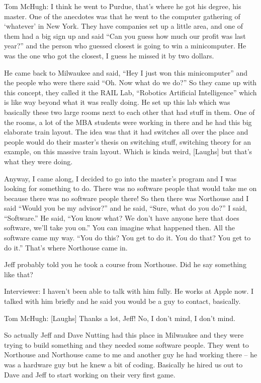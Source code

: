 \textcolor{interviewee}{Tom McHugh:} I think he went to Purdue, that’s where he got his degree, his master. One of the anecdotes was that he went to the computer gathering of ‘whatever’ in New York. They have companies set up a little area, and one of them had a big sign up and said “Can you guess how much our profit was last year?” and the person who guessed closest is going to win a minicomputer. He was the one who got the closest, I guess he missed it by two dollars.

He came back to Milwaukee and said, “Hey I just won this minicomputer” and the people who were there said “Oh. Now what do we do?” So they came up with this concept, they called it the RAIL Lab, “Robotics Artificial Intelligence” which is like way beyond what it was really doing. He set up this lab which was basically these two large rooms next to each other that had stuff in them. One of the rooms, a lot of the MBA students were working in there and he had this big elaborate train layout. The idea was that it had switches all over the place and people would do their master’s thesis on switching stuff, switching theory for an example, on this massive train layout. Which is kinda weird, [Laughs] but that’s what they were doing.

Anyway, I came along, I decided to go into the master’s program and I was looking for something to do. There was no software people that would take me on because there was no software people there! So then there was Northouse and I said “Would you be my advisor?” and he said, “Sure, what do you do?” I said, “Software.” He said, “You know what? We don’t have anyone here that does software, we’ll take you on.” You can imagine what happened then. All the software came my way. “You do this? You get to do it. You do that? You get to do it.” That’s where Northouse came in.

Jeff probably told you he took a course from Northouse. Did he say something like that?

\textcolor{interviewer}{Interviewer:} I haven’t been able to talk with him fully. He works at Apple now. I talked with him briefly and he said you would be a guy to contact, basically.

\textcolor{interviewee}{Tom McHugh:} [Laughs] Thanks a lot, Jeff! No, I don’t mind, I don’t mind.

So actually Jeff and Dave Nutting had this place in Milwaukee and they were trying to build something and they needed some software people. They went to Northouse and Northouse came to me and another guy he had working there – he was a hardware guy but he knew a bit of coding. Basically he hired us out to Dave and Jeff to start working on their very first game.

